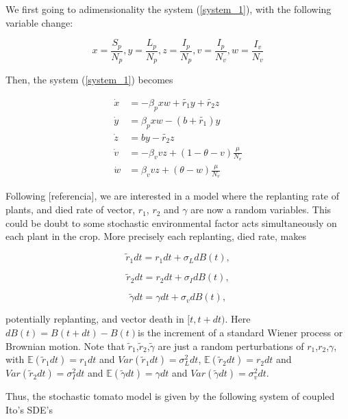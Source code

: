 We first going to adimensionality the system (\ref{system_1}), with the following variable change:

\begin{equation*}
	x=\frac{S_p}{N_p}, y=\frac{L_p}{N_p}, z=\frac{I_p}{N_p}, v=\frac{I_p}{N_v}, w=\frac{I_v}{N_v}
\end{equation*}

Then, the system (\ref{system_1}) becomes

\begin{align}\label{system_2}
\dot{x} &=
-\beta_p x w + \tilde{r_1} y + \tilde{r_2} z \\
\dot{y} &=
\beta_p x w - (b + \tilde{r_1}) y \\
\dot{z} &=
b y - \tilde{r_2} z \\
\dot{v} &=
-\beta_v v z  +(1-\theta-v)\frac{\mu}{N_v} \\
\dot{w} &=
\beta_v v z + (\theta-w) \frac{\mu}{N_v}
\end{align}


Following [referencia], we are interested in a model where the replanting rate of plants, and died rate of vector, $r_1$, $r_2$ and $\gamma$ are now a random variables. This could be doubt to some stochastic environmental factor acts simultaneously on each plant in the crop. More precisely each replanting, died rate, makes

\begin{equation}\label{eq1}
	\tilde{r}_1 dt = r_1 dt+\sigma_LdB(t),
\end{equation}

\begin{equation}\label{eq2}
\tilde{r}_2 dt = r_2 dt+\sigma_IdB(t),
\end{equation}

\begin{equation}\label{eq3}
\tilde{\gamma} dt = \gamma dt+\sigma_vdB(t),
\end{equation}

potentially replanting, and vector death  in $[t, t + dt)$. Here $dB(t) =B(t+dt)-B(t)$is the increment of a standard Wiener process or Brownian motion. Note that $\tilde{r}_1$,$\tilde{r}_2$,$\tilde{\gamma}$ are just a random perturbations of $r_1$,$r_2$,$\gamma$, with $\mathbb{E}(\tilde{r}_1dt) = r_1dt$ and $Var(\tilde{r}_1dt) = \sigma_L^2dt$, $\mathbb{E}(\tilde{r}_2dt) = r_2dt$ and $Var(\tilde{r}_2dt) = \sigma_I^2dt$ and $\mathbb{E}(\tilde{\gamma}dt) = \gamma dt$ and $Var(\tilde{\gamma}dt) = \sigma_v^2dt$.

Thus, the stochastic tomato model is given by the following system of coupled Ito's SDE's


